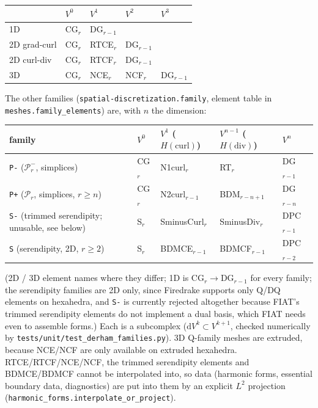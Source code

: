 \documentclass[11pt]{article}
\newcommand{\dd}{\mathrm{d}}
\newcommand{\code}[1]{\texttt{#1}}
\theoremstyle{remark}
\begin{document}
\begin{center}
\renewcommand{\arraystretch}{1.2}
\begin{tabular}{@{}lllll@{}}
\toprule
& $V^0$ & $V^1$ & $V^2$ & $V^3$\\
\midrule
1D & CG$_r$ & DG$_{r-1}$ & & \\
2D grad-curl & CG$_r$ & RTCE$_r$ & DG$_{r-1}$ & \\
2D curl-div & CG$_r$ & RTCF$_r$ & DG$_{r-1}$ & \\
3D & CG$_r$ & NCE$_r$ & NCF$_r$ & DG$_{r-1}$\\
\bottomrule
\end{tabular}
\end{center}

The other families (\code{spatial-discretization.family}, element table in
\code{meshes.family\_elements}) are, with $n$ the dimension:

\begin{center}
\renewcommand{\arraystretch}{1.2}
\begin{tabular}{@{}lllll@{}}
\toprule
family & $V^0$ & $V^1$ ($H(\mathrm{curl})$) & $V^{n-1}$ ($H(\mathrm{div})$) & $V^n$\\
\midrule
\code{P-} ($\mathcal{P}_r^-$, simplices) & CG$_r$ & N1curl$_r$ & RT$_r$ & DG$_{r-1}$\\
\code{P+} ($\mathcal{P}_r$, simplices, $r\ge n$) & CG$_r$ & N2curl$_{r-1}$ & BDM$_{r-n+1}$ & DG$_{r-n}$\\
\code{S-} (trimmed serendipity; unusable, see below) & S$_r$ & SminusCurl$_r$ & SminusDiv$_r$ & DPC$_{r-1}$\\
\code{S} (serendipity, 2D, $r\ge2$) & S$_r$ & BDMCE$_{r-1}$ & BDMCF$_{r-1}$ & DPC$_{r-2}$\\
\bottomrule
\end{tabular}
\end{center}

\noindent (2D / 3D element names where they differ; 1D is CG$_r\to$DG$_{r-1}$ for every family;
the serendipity families are 2D only, since Firedrake supports only Q/DQ elements on hexahedra, and
\code{S-} is currently rejected altogether because FIAT's trimmed serendipity elements do not implement a
dual basis, which FIAT needs even to assemble forms.)
Each is a subcomplex ($\dd V^k\subset V^{k+1}$, checked numerically by
\code{tests/unit/test\_derham\_families.py}). 3D Q-family meshes are extruded, because NCE/NCF
are only available on extruded hexahedra. RTCE/RTCF/NCE/NCF, the trimmed serendipity elements and BDMCE/BDMCF cannot be interpolated into,
so data (harmonic forms, essential boundary data, diagnostics) are put into them by an explicit $L^2$
projection (\code{harmonic\_forms.interpolate\_or\_project}).
\end{document}
